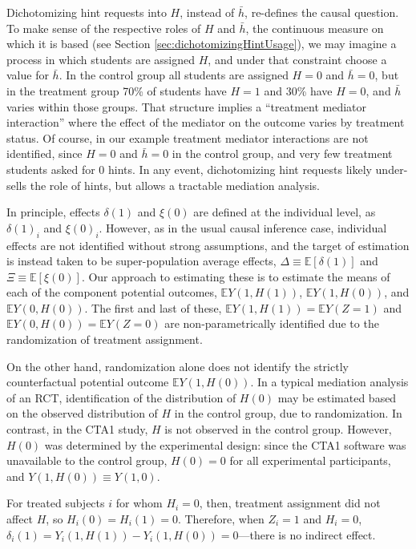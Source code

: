 \documentclass{article}\usepackage[]{graphicx}\usepackage[]{color}
\newcommand{\EE}{\mathbb{E}}
\begin{document}
Dichotomizing hint requests into $H$, instead of $\bar{h}$, re-defines
the causal question.
To make sense of the respective roles of $H$ and $\bar{h}$, the
continuous measure on which it is based (see Section
\ref{sec:dichotomizingHintUsage}),
we may imagine a process in
which students are assigned $H$, and under that constraint choose a
value for $\bar{h}$.
In the control group all students are assigned $H=0$ and $\bar{h}=0$, but
in the treatment group 70\% of students have $H=1$ and 30\% have
$H=0$, and $\bar{h}$ varies within those groups.
That structure implies a ``treatment mediator interaction''
where the effect of the mediator on the outcome varies by treatment
status.
Of course, in our example treatment mediator interactions are not
identified, since $H=0$ and $\bar{h}=0$ in the control group, and very
few treatment students asked for 0 hints.
In any event, dichotomizing hint requests likely under-sells the role
of hints, but allows a tractable mediation analysis.

In principle, effects $\delta(1)$ and $\xi(0)$ are defined at the
individual level, as $\delta(1)_i$ and $\xi(0)_i$.
However, as in the usual causal inference case, individual effects are
not identified without strong assumptions, and the target of
estimation is instead taken to be super-population average effects,
$\Delta\equiv\EE[\delta(1)]$ and $\Xi\equiv\EE[\xi(0)]$. Our approach to estimating these
is to estimate the means of each of the component potential outcomes,
$\EE Y(1,H(1))$, $\EE Y(1,H(0))$, and $\EE Y(0,H(0))$.
The first and last of these, $\EE Y(1,H(1))=\EE Y(Z=1)$ and $\EE
Y(0,H(0))=\EE Y(Z=0)$ are non-parametrically identified due to the
randomization of treatment assignment.

On the other hand, randomization alone does not identify the strictly counterfactual
potential outcome $\EE Y(1,H(0))$.
In a typical mediation analysis of an RCT, identification of the
distribution of $H(0)$ may be estimated based on the observed
distribution of $H$ in the control group, due to randomization.
In contrast, in the CTA1 study, $H$ is not observed in the control
group.
However, $H(0)$ was determined by the experimental design: since the
CTA1 software was unavailable to the control group, $H(0)=0$ for all
experimental participants, and $Y(1,H(0))\equiv Y(1,0)$.

For treated subjects $i$ for whom $H_i=0$, then, treatment assignment
did not affect $H$, so $H_i(0)=H_i(1)=0$.
Therefore, when $Z_i=1$ and $H_i=0$,
$\delta_i(1)=Y_i(1,H(1))-Y_i(1,H(0))=0$---there is no
indirect effect.
\end{document}
